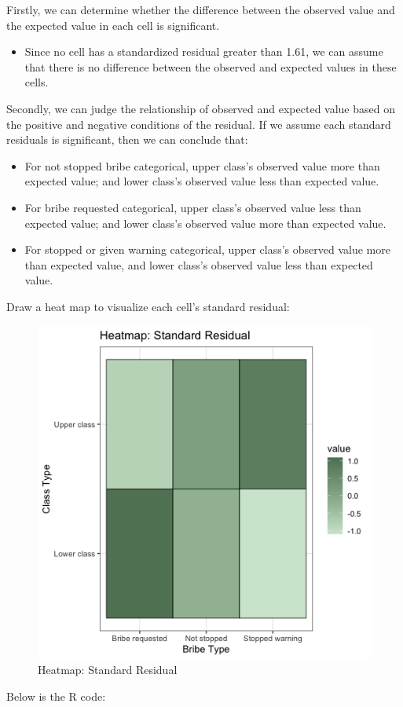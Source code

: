 \documentclass[12pt,letterpaper]{article}
\begin{document}
\begin{enumerate}
	Firstly, we can determine whether the difference between the observed value and the expected value in each cell is significant.
	\begin{itemize}
		\item Since no cell has a standardized residual greater than 1.61, we can assume that there is no difference between the observed and expected values in these cells.
	\end{itemize}
	Secondly, we can judge the relationship of observed and expected value based on the positive and negative conditions of the residual. If we assume each standard residuals is significant, then we can conclude that: 
	\begin{itemize}
		\item For not stopped bribe categorical, upper class's observed value more than expected value; and lower class's observed value less than expected value.
		\item For bribe requested categorical, upper class's observed value less than expected value; and lower class's observed value more than expected value.
		\item For stopped or given warning categorical, upper class's observed value more than expected value, and lower class's observed value less than expected value.
	\end{itemize}
	
	Draw a heat map to visualize each cell's standard residual:
	\begin{figure}[h]
		\centering
		\caption{Heatmap: Standard Residual}
		\includegraphics[scale=0.5]{Heatmap_Standard_Residual.png}
	\end{figure}
	\newpage
	Below is the R code:
	
\end{enumerate}
\newpage
\end{document}
